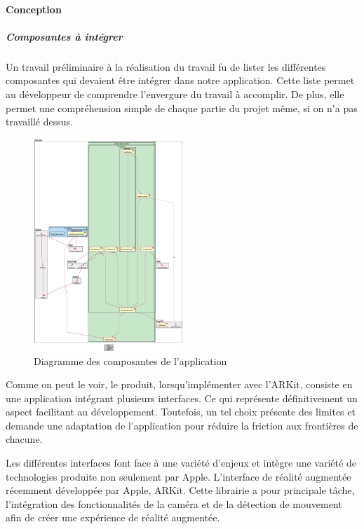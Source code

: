 \documentclass[rapport.tex]{subfiles}
\begin{document}
\paragraph*{Conception}
\subparagraph*{Composantes à intégrer}
Un travail préliminaire à la réalisation du travail fu de lister les différentes composantes qui devaient être intégrer dans notre application. Cette liste permet au développeur de comprendre l'envergure du travail à accomplir. De plus, elle permet une compréhension simple de chaque partie du projet même, si on n'a pas travaillé dessus.
\begin{figure}[H]
    \includegraphics[width=0.5\textwidth]{project-architecture.eps}
\centering
    \caption{Diagramme des composantes de l'application}
\end{figure}
\par
Comme on peut le voir, le produit, lorsqu’implémenter avec l’ARKit, consiste en une application intégrant plusieurs interfaces. Ce qui représente définitivement un aspect facilitant au développement. Toutefois, un tel choix présente des limites et demande une adaptation de l’application pour réduire la friction aux frontières de chacune.
\par
Les différentes interfaces font face à une variété d’enjeux et intègre une variété de technologies produite non seulement par Apple. L’interface de réalité augmentée récemment développée par Apple, ARKit. Cette librairie a pour principale tâche, l’intégration des fonctionnalités de la caméra et de la détection de mouvement afin de créer une expérience de réalité augmentée.\citep*{aRKitDoc}
\end{document}
